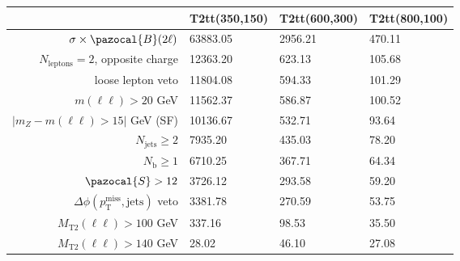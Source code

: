 \documentclass[10pt,oneside]{report}
\begin{document}
\begin{preview}
\begin{tabular}{r|lll}
                                                                    & T2tt(350,150) & T2tt(600,300) & T2tt(800,100) \\\hline
  $\sigma \times \pazocal{B}(2\ell)$                                &      63883.05 &       2956.21 &        470.11 \\
  $N_{\textrm{leptons}}=2$, opposite charge                         &      12363.20 &        623.13 &        105.68 \\
  loose lepton veto                                                 &      11804.08 &        594.33 &        101.29 \\
  $m(\ell\ell)>20$ GeV                                              &      11562.37 &        586.87 &        100.52 \\
  $|m_{Z}-m(\ell\ell) > 15|$ GeV (SF)                               &      10136.67 &        532.71 &         93.64 \\
  $N_{\textrm{jets}}\geq2$                                          &       7935.20 &        435.03 &         78.20 \\
  $N_{\textrm{b}}\geq1$                                             &       6710.25 &        367.71 &         64.34 \\
  $\pazocal{S}>12$                                                  &       3726.12 &        293.58 &         59.20 \\
  $\Delta \phi(p_{\textrm{T}}^{\textrm{miss}}, \textrm{jets})$ veto &       3381.78 &        270.59 &         53.75 \\
  $M_{\textrm{T2}}(\ell\ell)>100$ GeV                               &        337.16 &         98.53 &         35.50 \\
  $M_{\textrm{T2}}(\ell\ell)>140$ GeV                               &         28.02 &         46.10 &         27.08 \\

\end{tabular}
\end{preview}
\end{document}
